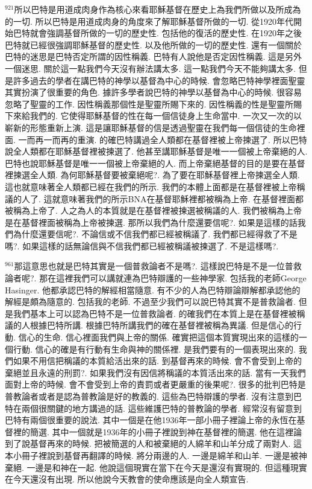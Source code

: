\documentclass{book}
\begin{document}
$^{921}$所以巴特是用道成肉身作為核心來看耶穌基督在歷史上為我們所做以及所成為的一切.
所以巴特是用道成肉身的角度來了解耶穌基督所做的一切.
從1920年代開始巴特就會強調基督所做的一切的歷史性.
包括他的復活的歷史性.
在1920年之後巴特就已經很強調耶穌基督的歷史性.
以及他所做的一切的歷史性.
還有一個關於巴特的迷思是巴特否定所謂的因性稱義.
巴特有人說他是否定因性稱義.
這是另外一個迷思.
關於這一點我們今天沒有辦法講太多.
這一點我們今天不能夠講太多.
但是許多過去的學者在講巴特的神學以基督為中心的時候.
會忽略巴特神學裡面聖靈其實扮演了很重要的角色.
據許多學者說巴特的神學以基督為中心的時候.
很容易忽略了聖靈的工作.
因性稱義那個性是聖靈所賜下來的.
因性稱義的性是聖靈所賜下來給我們的.
它使得耶穌基督的性在每一個信徒身上生命當中.
一次又一次的以嶄新的形態重新上演.
這是讓耶穌基督的信是透過聖靈在我們每一個信徒的生命裡面.
一而再一而再的重演.
的確巴特講過全人類都在基督裡被上帝揀選了.
所以巴特說全人類都在耶穌基督裡被揀選了.
他甚至講耶穌基督是唯一一個被上帝棄絕的人.
巴特也說耶穌基督是唯一一個被上帝棄絕的人.
而上帝棄絕基督的目的是要在基督裡揀選全人類.
為何耶穌基督要被棄絕呢?.
為了要在耶穌基督裡上帝揀選全人類.
這也就意味著全人類都已經在我們的所示.
我們的本體上面都是在基督裡被上帝稱議的人了.
這就意味著我們的所示BNA在基督耶穌裡都被稱為上帝.
在基督裡面都被稱為上帝了.
人之為人的本質就是在基督裡被揀選被稱議的人.
我們被稱為上帝是在基督裡面被稱為上帝被揀選.
那所以我們為什麼還要信呢?.
如果是這樣的話我們為什麼還要信呢?.
不論信或不信我們都已經被稱議了.
我們都已經得救了不是嗎?.
如果這樣的話無論信與不信我們都已經被稱議被揀選了.
不是這樣嗎?.

$^{961}$那這意思也就是巴特其實是一個普救論者不是嗎?.
這樣說巴特是不是一位普救論者呢?.
那在這裡我們可以講就連為巴特辯護的一些神學家.
包括我的老師George Hasinger.
他都承認巴特的解經相當隨意.
有不少的人為巴特辯論辯解都承認他的解經是頗為隨意的.
包括我的老師.
不過至少我們可以說巴特其實不是普救論者.
但是我們基本上可以認為巴特不是一位普救論者.
的確我們在本質上是在基督裡被稱議的人根據巴特所講.
根據巴特所講我們的確在基督裡被稱為異議.
但是信心的行動.
信心的生命.
信心裡面我們與上帝的關係.
確實把這個本質實現出來的這樣的一個行動.
信心的確是有行動有生命與神的關係裡.
是我們要有的一個表現出來的.
我們如果不用信把稱議的本質給活出來的話.
到基督再來的時候.
會不會受到上帝的棄絕並且永遠的刑罰?.
如果我們沒有因信將稱議的本質活出來的話.
當有一天我們面對上帝的時候.
會不會受到上帝的責罰或者更嚴重的後果呢?.
很多的批判巴特是普教論者或者是認為普教論是好的教義的.
這些為巴特辯護的學者.
沒有注意到巴特在兩個很關鍵的地方講過的話.
這些維護巴特的普教論的學者.
經常沒有留意到巴特有兩個很重要的說法.
其中一個是在他1936年一部小冊子裡論上帝的永恆在基督裡的簡選.
其中一個就是1936年的小冊子裡說到神在基督裡的簡選.
他在這裡論到了說基督再來的時候.
把被簡選的人和被棄絕的人綿羊和山羊分成了兩對人.
這本小冊子裡說到基督再翻譯的時候.
將分兩邊的人.
一邊是綿羊和山羊.
一邊是被神棄絕.
一邊是和神在一起.
他說這個現實在當下在今天是還沒有實現的.
但這種現實在今天還沒有出現.
所以他說今天教會的使命應該是向全人類宣告.
\end{document}
